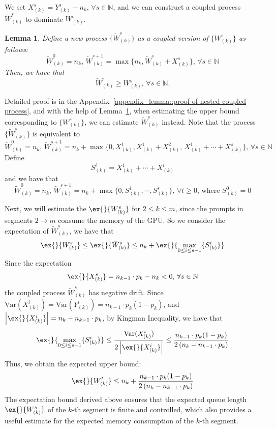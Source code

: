 \documentclass[preprint]{article}
\theoremstyle{plain}
\newtheorem{lemma}[theorem]{Lemma}
\theoremstyle{definition}
\theoremstyle{remark}
\begin{document}
We set $X^s_{(k)} = Y^s_{(k)} - n_{k},\,\forall s\in \mathbb{N} $, and we can construct a coupled process $\tilde{W}^s_{(k)}$ to dominate $W^s_{(k)}$.
\begin{lemma}\label{lemma::nested coupled process}
Define a new process $\{ \tilde{W}^s_{(k)} \}$ as a coupled version of $\{ W^s_{(k)} \}$ as follows:
$$\tilde{W}^0_{(k)} = n_{k},\,\tilde{W}^{s+1}_{(k)}=
\max\{ n_{k},\tilde{W}^{s}_{(k)} + X^s_{(k)}\},\,\forall s\in \mathbb{N} $$
Then, we have that 
$$ \tilde{W}_{(k)}^s \geq W^s_{(k)},\,\forall s\in \mathbb{N} .$$
\end{lemma}
Detailed proof is in the Appendix~\ref{appendix_lemma::proof of nested coupled process}, and with the help of Lemma~\ref{lemma::nested coupled process}, when estimating the upper bound corresponding to $\{W^s_{(k)}\}$, we can estimate $\tilde{W}^s_{(k)}$ instead. Note that the process $\{\tilde{W}^s_{(k)}\}$ is equivalent to
$$\tilde{W}^0_{(k)} = n_{k},\,\tilde{W}^{s+1}_{(k)} =n_{k}+ \max\{ 0, X^1_{(k)},X^1_{(k)}+X^2_{(k)},\, X^1_{(k)}+\cdots+X^s_{(k)} \},\,\forall s\in \mathbb{N} $$
Define 
$$S^i_{(k)} = X^1_{(k)}+\cdots+X^i_{(k)}$$
and we have that
$$\tilde{W}^0_{(k)} = n_{k},\,\tilde{W}^{s+1}_{(k)} =n_{k}+ \max\{ 0, S^1_{(k)} ,\cdots,S^s_{(k)}  \},\,\forall t\geq 0,\,\text{where }S^0_{(k)}=0$$

Next, we will estimate the $\ex{}{W^{s}_{(k)}}$ for $2\leq k\leq m$, since the prompts in segments $2\to m$ consume the memory of the GPU. So we consider the expectation of $\tilde{W}^s_{(k)}$, we have that 
$$\ex{}{W^s_{(k)}}\leq \ex{}{\tilde{W}^s_{(k)}}\leq n_k+\ex{}{\max_{0\leq i\leq s-1}\{S^i_{(k)}\}} $$
Since the expectation
$$\ex{}{X^s_{(k)}} =  n_{k-1}\cdot p_k - n_{k}<0 ,\,\forall s\in \mathbb{N}$$
the coupled process $\tilde{W}^s_{(k)}$ has negative drift. Since $\text{Var}(X^i_{(k)})=\text{Var}(Y^i_{(k)})=n_{k-1}\cdot p_k(1-p_k)$, and $\left|\ex{}{X^i_{(k)}}\right|= n_{k}-n_{k-1}\cdot p_k$, by Kingman Inequality, we have that
$$\ex{}{\max_{0\leq i\leq s-1}\{S^i_{(k)}\}}  \leq  \frac{\text{Var}(X^i_{(k)})}{ 2\left|\ex{}{X^i_{(k)}}\right| }\leq   \frac{n_{k-1}\cdot p_k(1-p_k)}{2\left(n_{k}-n_{k-1}\cdot p_k\right)}$$
Thus, we obtain the expected upper bound:
$$\ex{}{W^t_{(k)}}\leq n_k +\frac{n_{k-1}\cdot p_k(1-p_k)}{2\left(n_{k}-n_{k-1}\cdot p_k\right)}$$
The expectation bound derived above ensures that the expected queue length $\ex{}{W^s_{(k)}}$ of the $k$-th segment is finite and controlled, which also provides a useful estimate for the expected memory consumption of the $k$-th segment. 
\end{document}
